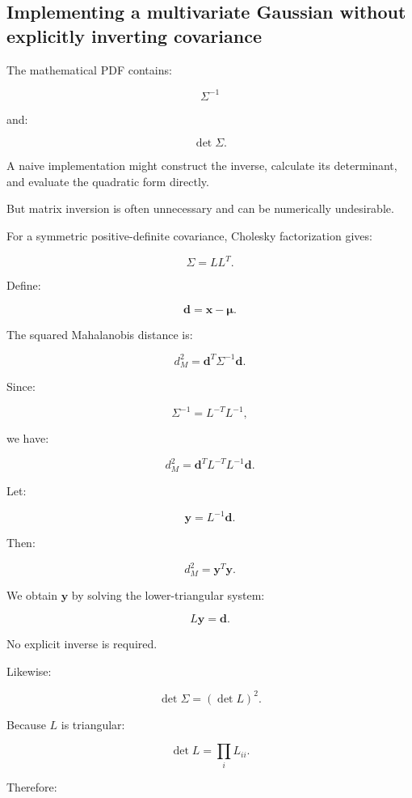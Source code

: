 \subsection{Implementing a multivariate Gaussian without explicitly inverting covariance}\label{02-foundations-ii-ch031-implementing-a-multivariate-gaussian-without-explicitly-inverting-covariance}

\hypertarget{02-foundations-ii-ch031-implementing-a-multivariate-gaussian-without-explicitly-inverting-covariance}{}

The mathematical PDF contains:

\[
 \Sigma^{-1}
\]

and:

\[
 \det\Sigma.
\]

A naive implementation might construct the inverse, calculate its determinant, and evaluate the quadratic form directly.

But matrix inversion is often unnecessary and can be numerically undesirable.

For a symmetric positive-definite covariance, Cholesky factorization gives:

\[
 \boxed{\Sigma=LL^T}.
\]

Define:

\[
 \mathbf d=\mathbf x-\boldsymbol\mu.
\]

The squared Mahalanobis distance is:

\[
 d_M^2=\mathbf d^T\Sigma^{-1}\mathbf d.
\]

Since:

\[
 \Sigma^{-1}=L^{-T}L^{-1},
\]

we have:

\[
 d_M^2= \mathbf d^TL^{-T}L^{-1}\mathbf d.
\]

Let:

\[
 \mathbf y=L^{-1}\mathbf d.
\]

Then:

\[
 \boxed{d_M^2=\mathbf y^T\mathbf y}.
\]

We obtain \(\mathbf y\) by solving the lower-triangular system:

\[
 L\mathbf y=\mathbf d.
\]

No explicit inverse is required.

Likewise:

\[
 \det\Sigma=(\det L)^2.
\]

Because \(L\) is triangular:

\[
 \det L=\prod_iL_{ii}.
\]

Therefore:


